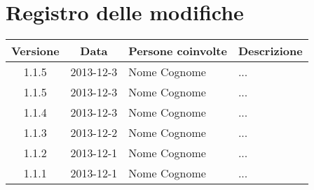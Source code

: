 \section*{Registro delle modifiche}

\small{
\begin{tabularx}{\textwidth}{|c|c|l|X|}
 \hline \textbf{Versione} & \textbf{Data} & \textbf{Persone coinvolte} & \textbf{Descrizione} \\

 
 \hline 1.1.5 & 2013-12-3 & Nome Cognome &
 ...\\

 \hline 1.1.5 & 2013-12-3 & Nome Cognome &
 ...\\

 \hline 1.1.4 & 2013-12-3 & Nome Cognome &
 ...\\

 \hline 1.1.3 & 2013-12-2 & Nome Cognome &
 ...\\

 \hline 1.1.2 & 2013-12-1 & Nome Cognome &
 ...\\

 \hline 1.1.1 & 2013-12-1 & Nome Cognome &
 ...\\

 \hline
\end{tabularx}
}
